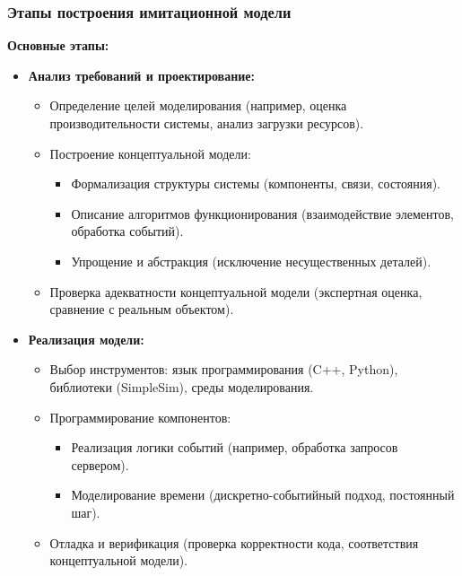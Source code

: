 \subsubsection*{Этапы построения имитационной модели}
\textbf{Основные этапы:}
\begin{itemize}
    \item \textbf{Анализ требований и проектирование:}
        \begin{itemize}
            \item Определение целей моделирования (например, оценка производительности системы, анализ загрузки ресурсов).
            \item Построение концептуальной модели:
                \begin{itemize}
                    \item Формализация структуры системы (компоненты, связи, состояния).
                    \item Описание алгоритмов функционирования (взаимодействие элементов, обработка событий).
                    \item Упрощение и абстракция (исключение несущественных деталей).
                \end{itemize}
            \item Проверка адекватности концептуальной модели (экспертная оценка, сравнение с реальным объектом).
        \end{itemize}
    
    \item \textbf{Реализация модели:}
        \begin{itemize}
            \item Выбор инструментов: язык программирования (C++, Python), библиотеки (SimpleSim), среды моделирования.
            \item Программирование компонентов:
                \begin{itemize}
                    \item Реализация логики событий (например, обработка запросов сервером).
                    \item Моделирование времени (дискретно-событийный подход, постоянный шаг).
                \end{itemize}
            \item Отладка и верификация (проверка корректности кода, соответствия концептуальной модели).
        \end{itemize}
    

\end{itemize}
